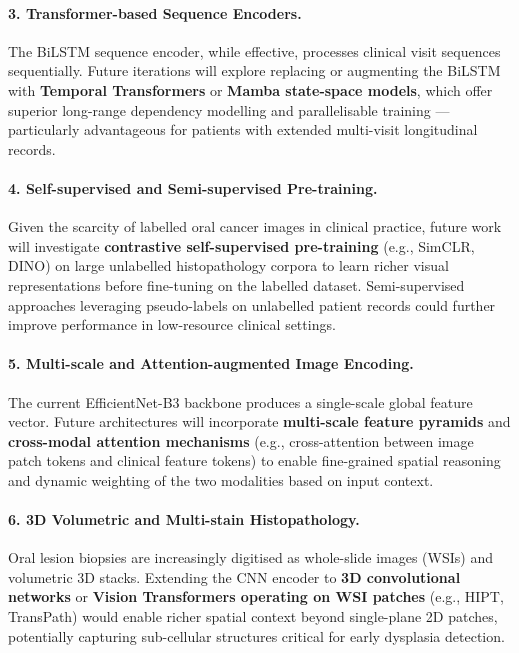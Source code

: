 \paragraph{3. Transformer-based Sequence Encoders.}
The BiLSTM sequence encoder, while effective, processes clinical visit sequences sequentially. Future iterations will explore replacing or augmenting the BiLSTM with \textbf{Temporal Transformers} or \textbf{Mamba state-space models}, which offer superior long-range dependency modelling and parallelisable training — particularly advantageous for patients with extended multi-visit longitudinal records.

\paragraph{4. Self-supervised and Semi-supervised Pre-training.}
Given the scarcity of labelled oral cancer images in clinical practice, future work will investigate \textbf{contrastive self-supervised pre-training} (e.g., SimCLR, DINO) on large unlabelled histopathology corpora to learn richer visual representations before fine-tuning on the labelled dataset. Semi-supervised approaches leveraging pseudo-labels on unlabelled patient records could further improve performance in low-resource clinical settings.

\paragraph{5. Multi-scale and Attention-augmented Image Encoding.}
The current EfficientNet-B3 backbone produces a single-scale global feature vector. Future architectures will incorporate \textbf{multi-scale feature pyramids} and \textbf{cross-modal attention mechanisms} (e.g., cross-attention between image patch tokens and clinical feature tokens) to enable fine-grained spatial reasoning and dynamic weighting of the two modalities based on input context.

\paragraph{6. 3D Volumetric and Multi-stain Histopathology.}
Oral lesion biopsies are increasingly digitised as whole-slide images (WSIs) and volumetric 3D stacks. Extending the CNN encoder to \textbf{3D convolutional networks} or \textbf{Vision Transformers operating on WSI patches} (e.g., HIPT, TransPath) would enable richer spatial context beyond single-plane 2D patches, potentially capturing sub-cellular structures critical for early dysplasia detection.

